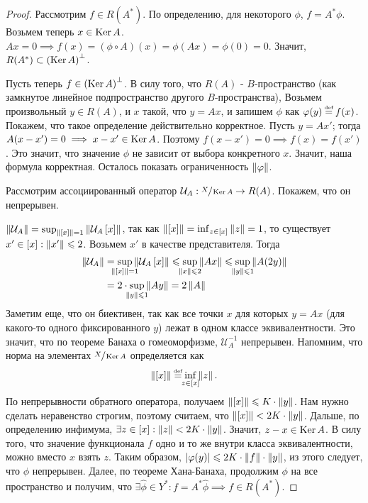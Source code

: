 \begin{proof}
	Рассмотрим $f \in R(A^*)$. По определению, для некоторого $\phi$, $f = A^*\phi$.
	Возьмем теперь $x \in \operatorname{Ker} A$. $Ax = 0 \implies f(x) = (\phi \circ A)(x) = \phi(Ax) = \phi(0) = 0$.
	Значит, $R(A^*) \subset \left( \operatorname{Ker} A\right)^\bot$.
	
	Пусть теперь $f \in \left( \operatorname{Ker} A\right)^\bot$. В силу того, что $R(A)$ - $B$-пространство
	(как замкнутое линейное подпространство другого $B$-пространства),
	Возьмем произвольный $y \in R(A)$, и $x$ такой, что $y = Ax$,
	и запишем $\phi$ как $\phi(y) \defeq f(x)$. Покажем, что такое определение
	действительно корректное.
	Пусть $y = Ax'$; тогда $A(x - x') = 0 \implies x - x' \in \operatorname{Ker} A$.
	Поэтому $f(x - x') = 0 \implies f(x) = f(x')$. Это значит, что значение $\phi$ не
	зависит от выбора конкретного $x$. Значит, наша формула корректная.
	Осталось показать ограниченность $\left\|\varphi\right\|$.

	Рассмотрим ассоциированный оператор
	$\mathcal{U}_A : \sfrac{X}{\operatorname{Ker} A} \rightarrow R(A)$.
	Покажем, что он непрерывен.

	$\left\|\mathcal{U}_A\right\| = \sup_{\left\|\left[x \right]\right\| = 1} \left\|\mathcal{U}_A\left[x \right]\right\|$,
	так как $\left\|\left[x \right]\right\| = \inf_{z \in \left[x \right]} \left\|z\right\| = 1$,
	то существует $x' \in \left[x \right] : \left\|x'\right\| \leqslant 2$.
	Возьмем $x'$ в качестве представителя. Тогда
	\begin{equation}
		\begin{split}
			\norm{\mathcal{U}_A} & =
            \sup_{\mathclap{\norm{\eqcls{x}} = 1}} \norm{\mathcal{U}_A\eqcls{x}}
            \leqslant \sup_{\mathclap{\norm{x} \leqslant 2}} \norm{Ax}
            \leqslant \sup_{\mathclap{\norm{y} \leqslant 1}} \norm{A(2y)} \\
            & = 2 \cdot \sup_{\mathclap{\norm{y} \leqslant 1}} \norm{Ay}
			= 2 \norm{A}
		\end{split}
	\end{equation}
	Заметим еще, что он биективен, так как все точки $x$ для которых $y = Ax$
	(для какого-то одного фиксированного $y$) лежат в одном классе эквивалентности.
    Это значит, что по теореме Банаха о гомеоморфизме, $\mathcal{U}_A^{-1}$ непрерывен.
    Напомним, что норма на элементах $\sfrac{X}{\operatorname{Ker} A}$ определяется как
	\begin{gather}
        \norm{\eqcls{x}} \defeq \inf_{\mathclap{z \in \eqcls{x}}} \norm{z}\text{.}
	\end{gather}
	По непрерывности обратного оператора, получаем $\left\|\left[x \right]\right\| \leqslant K \cdot \left\|y\right\|$.
	Нам нужно сделать неравенство строгим, поэтому считаем, что
	$\left\|\left[x \right]\right\| < 2K \cdot \left\|y\right\|$. Дальше, по определению инфимума,
	$\exists z \in \left[x \right] : \left\|z\right\| < 2K \cdot \left\|y\right\|$. Значит, $z - x \in \operatorname{Ker} A$.
	В силу того, что значение функционала $f$ одно и то же внутри класса эквивалентности,
	можно вместо $x$ взять $z$. Таким образом,
	$\left|\varphi(y)\right| \leqslant 2K \cdot \left\|f\right\| \cdot \left\|y\right\|$, из этого следует, что
	$\phi$ непрерывен.
	Далее, по теореме Хана-Банаха, продолжим $\phi$ на все пространство и получим, что
	$\exists \widehat{\phi} \in Y^* : f = A^*\widehat{\phi} \implies f \in R(A^*)$.
\end{proof}
